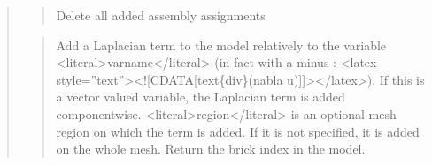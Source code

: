 \documentclass[a4paper,11pt,english]{sphinxmanual}
\begin{document}
\begin{quote}
\sphinxAtStartPar
{}
\begin{quote}

\sphinxAtStartPar
Delete all added assembly assignments
\end{quote}

\sphinxAtStartPar
{}
\begin{quote}

\sphinxAtStartPar
Add a Laplacian term to the model relatively to the variable \textless{}literal\textgreater{}varname\textless{}/literal\textgreater{}
(in fact with a minus : \textless{}latex style=”text”\textgreater{}\textless{}!{[}CDATA{[}\sphinxhyphen{}text\{div\}(nabla u){]}{]}\textgreater{}\textless{}/latex\textgreater{}).
If this is a vector valued variable, the Laplacian term is added
componentwise. \textless{}literal\textgreater{}region\textless{}/literal\textgreater{} is an optional mesh region on which the term
is added. If it is not specified, it is added on the whole mesh. Return
the brick index in the model.
\end{quote}

\sphinxAtStartPar
{}
\begin{quote}


\end{quote}
\end{quote}
\end{document}
